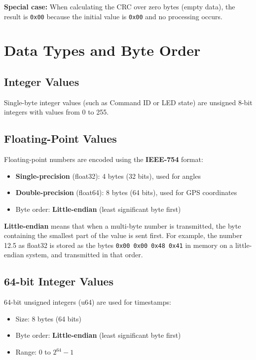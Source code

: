 \documentclass[12pt, titlepage]{article}
\begin{document}
\textbf{Special case:} When calculating the CRC over zero bytes (empty data), the result is \texttt{0x00} because the initial value is \texttt{0x00} and no processing occurs.

\section{Data Types and Byte Order}

\subsection{Integer Values}

Single-byte integer values (such as Command ID or LED state) are unsigned 8-bit
integers with values from 0 to 255.

\subsection{Floating-Point Values}

Floating-point numbers are encoded using the \textbf{IEEE-754} format:
\begin{itemize}
  \item \textbf{Single-precision} (float32): 4 bytes (32 bits), used for angles
  \item \textbf{Double-precision} (float64): 8 bytes (64 bits), used for GPS coordinates
  \item Byte order: \textbf{Little-endian} (least significant byte first)
\end{itemize}

\textbf{Little-endian} means that when a multi-byte number is transmitted, the byte containing the smallest part of the value is sent first. For example, the number 12.5 as float32 is stored as the bytes \texttt{0x00 0x00 0x48 0x41} in memory on a little-endian system, and transmitted in that order.

\subsection{64-bit Integer Values}

64-bit unsigned integers (u64) are used for timestamps:
\begin{itemize}
  \item Size: 8 bytes (64 bits)
  \item Byte order: \textbf{Little-endian} (least significant byte first)
  \item Range: 0 to $2^{64}-1$
\end{itemize}
\end{document}
